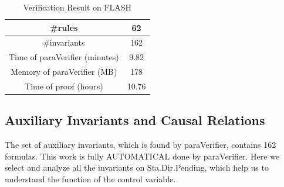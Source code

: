 \documentclass{llncs}
\begin{document}
\begin{table}[!htbp]
  \centering
  \footnotesize
   \caption{Verification Result on FLASH}
  \label{tab:flashRes}
  \begin{tabular}{|c|c|}
    \hline
    \#rules & 62\\
    \hline
    \#invariants & 162\\
    \hline
    Time of {\sf paraVerifier} (minutes) & 9.82\\
    \hline
    Memory of {\sf paraVerifier} (MB) & 178\\
    \hline
    Time of proof (hours) & 10.76\\
    \hline
  \end{tabular}

\end{table}







\subsection{Auxiliary Invariants and Causal Relations}\label{sec:causal lines}


The set of auxiliary invariants, which is found by {\sf paraVerifier}, contains 162 formulas. This work is  fully AUTOMATICAL  done by {\sf paraVerifier}.  Here we select and analyze all the invariants on Sta.Dir.Pending, which help us to understand the function of the control variable.
\end{document}
